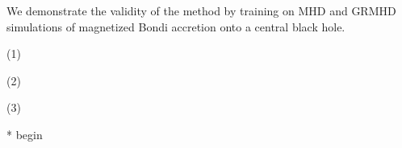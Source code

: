 \documentclass{article}
\begin{document}
We demonstrate the validity of the method by training on MHD and GRMHD simulations of magnetized Bondi accretion onto a central black hole.


(1) 

(2)

(3)

* begin 


\end{document}
